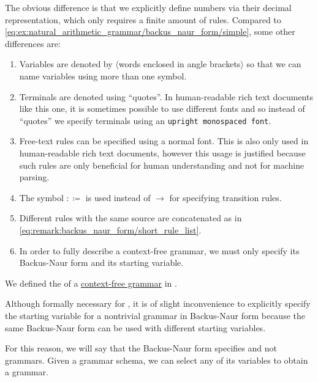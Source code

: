 \begin{example}
  The obvious difference is that we explicitly define numbers via their decimal representation, which only requires a finite amount of rules. Compared to \eqref{eq:ex:natural_arithmetic_grammar/backus_naur_form/simple}, some other differences are:
  \begin{enumerate}
    \item Variables are denoted by \( \langle \)words enclosed in angle brackets\( \rangle \) so that we can name variables using more than one symbol.
    \item Terminals are denoted using \enquote{quotes}. In human-readable rich text documents like this one, it is sometimes possible to use different fonts and so instead of \enquote{quotes} we specify terminals using an \texttt{upright monospaced font}.
    \item Free-text rules can be specified using a normal font. This is also only used in human-readable rich text documents, however this usage is justified because such rules are only beneficial for human understanding and not for machine parsing.
    \item The symbol \( :\coloneqq \) is used instead of \( \to \) for specifying transition rules.
    \item Different rules with the same source are concatenated as in \eqref{eq:remark:backus_naur_form/short_rule_list}.
    \item In order to fully describe a context-free grammar, we must only specify its Backus-Naur form and its starting variable.
  \end{enumerate}
\end{example}

\begin{definition}\label{def:backus_naur_form}
  We defined the  of a \hyperref[def:grammar/context_free]{context-free grammar} in .

  Although formally necessary for , it is of slight inconvenience to explicitly specify the starting variable for a nontrivial grammar in Backus-Naur form because the same Backus-Naur form can be used with different starting variables.

  For this reason, we will say that the Backus-Naur form specifies  and not grammars. Given a grammar schema, we can select any of its variables to obtain a grammar.
\end{definition}

